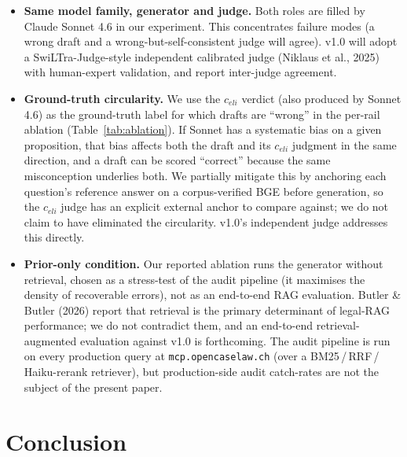 \documentclass[11pt,a4paper]{article}
\begin{document}
\begin{itemize}
        publication and by publishing the evidence-resolution
        audit trail; we cannot eliminate the bias, and v1.0
        addresses it directly with named expert co-authors and
        an independent annotation protocol.
  \item \textbf{Same model family, generator and judge.}  Both
        roles are filled by Claude Sonnet 4.6 in our experiment.
        This concentrates failure modes (a wrong draft and a
        wrong-but-self-consistent judge will agree).  v1.0 will
        adopt a SwiLTra-Judge-style independent calibrated judge
        (Niklaus et al., 2025) with human-expert validation, and
        report inter-judge agreement.
  \item \textbf{Ground-truth circularity.}  We use the
        $c_{eli}$ verdict (also produced by Sonnet 4.6) as the
        ground-truth label for which drafts are ``wrong'' in the
        per-rail ablation (Table~\ref{tab:ablation}).  If Sonnet
        has a systematic bias on a given proposition, that bias
        affects both the draft and its $c_{eli}$ judgment in the
        same direction, and a draft can be scored ``correct''
        because the same misconception underlies both.  We
        partially mitigate this by anchoring each question's
        reference answer on a corpus-verified BGE before
        generation, so the $c_{eli}$ judge has an explicit
        external anchor to compare against; we do not claim to
        have eliminated the circularity.  v1.0's independent
        judge addresses this directly.
  \item \textbf{Prior-only condition.}  Our reported ablation
        runs the generator without retrieval, chosen as a
        stress-test of the audit pipeline (it maximises the
        density of recoverable errors), not as an end-to-end RAG
        evaluation.  Butler \& Butler (2026) report that
        retrieval is the primary determinant of legal-RAG
        performance; we do not contradict them, and an
        end-to-end retrieval-augmented evaluation against v1.0
        is forthcoming.  The audit pipeline is run on every
        production query at \texttt{mcp.opencaselaw.ch} (over a
        BM25\,/\,RRF\,/\,Haiku-rerank retriever), but
        production-side audit catch-rates are not the subject
        of the present paper.
\end{itemize}


\section{Conclusion}
\label{sec:conclusion}
\end{document}
